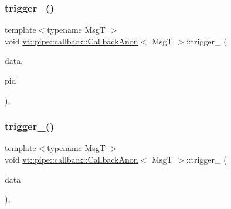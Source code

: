 \subsubsection{\texorpdfstring{trigger\+\_\+()}{trigger\_()}\hspace{0.1cm}{\footnotesize\ttfamily [1/2]}}
{\footnotesize\ttfamily template$<$typename MsgT $>$ \\
void \hyperlink{structvt_1_1pipe_1_1callback_1_1_callback_anon}{vt\+::pipe\+::callback\+::\+Callback\+Anon}$<$ MsgT $>$\+::trigger\+\_\+ (\begin{DoxyParamCaption}\item[{\hyperlink{structvt_1_1pipe_1_1callback_1_1_callback_anon_ac503b95feb44bb0b60c1d69e1ed29074}{Signal\+Data\+Type} $\ast$}]{data,  }\item[{\hyperlink{namespacevt_ac9852acda74d1896f48f406cd72c7bd3}{Pipe\+Type} const \&}]{pid }\end{DoxyParamCaption})\hspace{0.3cm}{\ttfamily [override]}, {\ttfamily [private]}}

\mbox{\label{structvt_1_1pipe_1_1callback_1_1_callback_anon_aa94691cc38d84194b66f5bbb30f43686}} 
\subsubsection{\texorpdfstring{trigger\+\_\+()}{trigger\_()}\hspace{0.1cm}{\footnotesize\ttfamily [2/2]}}
{\footnotesize\ttfamily template$<$typename MsgT $>$ \\
void \hyperlink{structvt_1_1pipe_1_1callback_1_1_callback_anon}{vt\+::pipe\+::callback\+::\+Callback\+Anon}$<$ MsgT $>$\+::trigger\+\_\+ (\begin{DoxyParamCaption}\item[{\hyperlink{structvt_1_1pipe_1_1callback_1_1_callback_anon_ac503b95feb44bb0b60c1d69e1ed29074}{Signal\+Data\+Type} $\ast$}]{data }\end{DoxyParamCaption})\hspace{0.3cm}{\ttfamily [override]}, {\ttfamily [private]}}

\mbox{\label{structvt_1_1pipe_1_1callback_1_1_callback_anon_a5e4d44e498c5a31a452fa75aa3714fac}} 
